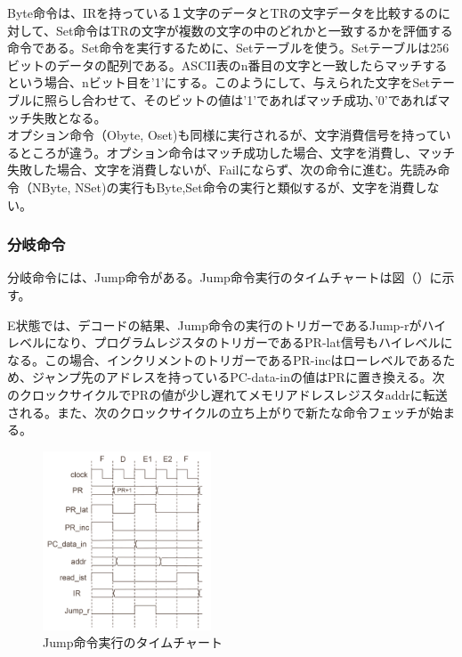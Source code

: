 \documentclass[paper]{ieicej}
\begin{document}
Byte命令は、IRを持っている１文字のデータとTRの文字データを比較するのに対して、Set命令はTRの文字が複数の文字の中のどれかと一致するかを評価する命令である。Set命令を実行するために、Setテーブルを使う。Setテーブルは256ビットのデータの配列である。ASCII表のn番目の文字と一致したらマッチするという場合、nビット目を'1'にする。このようにして、与えられた文字をSetテーブルに照らし合わせて、そのビットの値は'1'であればマッチ成功、'0'であればマッチ失敗となる。\\

オプション命令（Obyte, Oset)も同様に実行されるが、文字消費信号を持っているところが違う。オプション命令はマッチ成功した場合、文字を消費し、マッチ失敗した場合、文字を消費しないが、Failにならず、次の命令に進む。先読み命令（NByte, NSet)の実行もByte,Set命令の実行と類似するが、文字を消費しない。\\

\subsubsection{分岐命令}

分岐命令には、Jump命令がある。Jump命令実行のタイムチャートは図（）に示す。

E状態では、デコードの結果、Jump命令の実行のトリガーであるJump-rがハイレベルになり、プログラムレジスタのトリガーであるPR-lat信号もハイレベルになる。この場合、インクリメントのトリガーであるPR-incはローレベルであるため、ジャンプ先のアドレスを持っているPC-data-inの値はPRに置き換える。次のクロックサイクルでPRの値が少し遅れてメモリアドレスレジスタaddrに転送される。また、次のクロックサイクルの立ち上がりで新たな命令フェッチが始まる。


\begin{figure}[h]
    \begin{center}
        \includegraphics[width=50mm]{./fig/Jump}
       \caption{Jump命令実行のタイムチャート}
    \end{center}
\end{figure}
\end{document}
